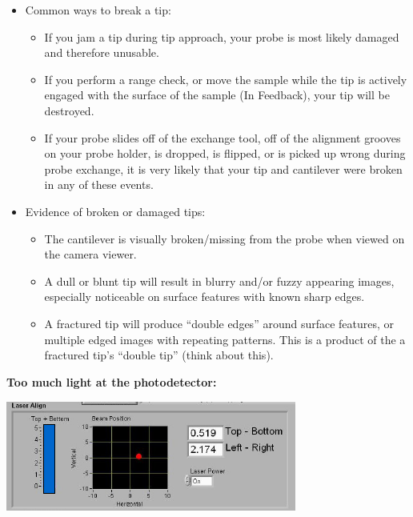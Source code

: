 \documentclass{../lab}
\begin{document}
\begin{itemize}
    \item Common ways to break a tip:

    \begin{itemize}
        \item If you jam a tip during tip approach, your probe is most likely damaged and therefore unusable.

        \item If you perform a range check, or move the sample while the tip is actively engaged with the surface of the sample (In Feedback), your tip will be destroyed.

        \item If your probe slides off of the exchange tool, off of the alignment grooves on your probe holder, is dropped, is flipped, or is picked up wrong during probe exchange, it is very likely that your tip and cantilever were broken in any of these events.

    \end{itemize}

    \item Evidence of broken or damaged tips:

    \begin{itemize}
        \item The cantilever is visually broken/missing from the probe when viewed on the camera viewer.

        \item A dull or blunt tip will result in blurry and/or fuzzy appearing images, especially noticeable on surface features with known sharp edges.

        \item A fractured tip will produce ``double edges'' around surface features, or multiple edged images with repeating patterns.  This is a product of the a fractured tip's ``double tip'' (think about this).

    \end{itemize}

\end{itemize}

\textbf{Too much light at the photodetector:}

\begin{center}
    \href{http://experimentationlab.berkeley.edu/sites/default/files/AFMImages/53.png}{\includegraphics[width=0.5\linewidth]{images/53.png}}
\end{center}
\end{document}
